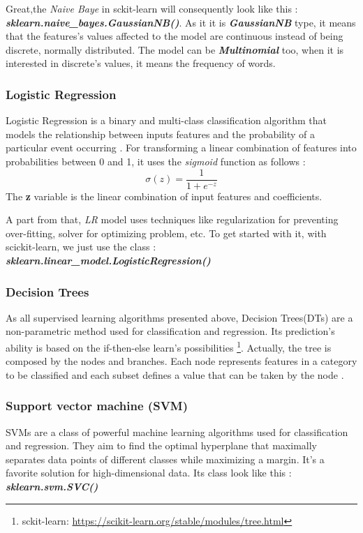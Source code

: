 \documentclass[12pt,a4paper, oneside]{book}
\begin{document}
Great,the \textit{Naive Baye} in sckit-learn will consequently look like this : \newline
\textbf{\textit{sklearn.naive\_bayes.GaussianNB()}}. As it it is \textbf{\textit{GaussianNB}} type, it means that the features's values affected to the model are continuous instead of being discrete, normally distributed. The model can be \textbf{\textit{Multinomial}} too, when it is interested in discrete's values, it means the frequency of words.
\subsubsection{Logistic Regression} 
Logistic Regression is a binary and multi-class classification algorithm that models the relationship between inputs features and the probability of a particular event occurring \citep{rymarczyk2019logistic}. For transforming a linear combination of features into probabilities between 0 and 1, it uses the \textit{sigmoid} function as follows :
\begin{equation} 
\label{sigmoidFunction}
\sigma(z) = \frac{1}{1 + e^{-z}}
\end{equation} 
The \textbf{z} variable is the linear combination of input features and coefficients. 

A part from that, \textit{LR} model uses techniques like regularization for preventing over-fitting, solver for optimizing problem, etc.
To get started with it, with scickit-learn, we just use the class :
\textbf{\textit{sklearn.linear\_model.LogisticRegression()}} 

\subsubsection{Decision Trees} 
As all supervised learning algorithms presented above, Decision Trees(DTs) are a non-parametric method used for classification and regression. Its prediction's ability is based on the if-then-else learn's possibilities \footnote{sckit-learn: \url{https://scikit-learn.org/stable/modules/tree.html} }. Actually, the tree is composed by the nodes and branches. Each node represents features in a category to be classified and each subset defines a value that can be taken by the node \citep{charbuty2021classification}.  
\subsubsection{Support vector machine (SVM)} 
SVMs are a class of powerful machine learning algorithms used for classification and regression. They aim to find the optimal hyperplane that maximally separates data points of different classes while maximizing a margin. It's a favorite solution for high-dimensional data\citep{memoireUniversitySpam}. Its class look like this : \textbf{\textit{sklearn.svm.SVC()}}
\end{document}
